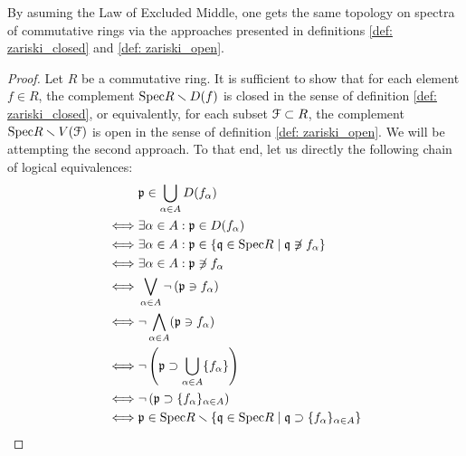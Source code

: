             \begin{proposition} \label{prop: zariski_topology_equivalence}
                By asuming the Law of Excluded Middle, one gets the same topology on spectra of commutative rings via the approaches presented in definitions \ref{def: zariski_closed} and \ref{def: zariski_open}.
            \end{proposition}
                \begin{proof}
                    Let $R$ be a commutative ring. It is sufficient to show that for each element $f \in R$, the complement $\Spec R \setminus D(f)$ is closed in the sense of definition \ref{def: zariski_closed}, or equivalently, for each subset $\calF \subset R$, the complement $\Spec R \setminus V(\calF)$ is open in the sense of definition \ref{def: zariski_open}. We will be attempting the second approach. To that end, let us directly the following chain of logical equivalences:
                        $$
                            \begin{aligned}
                                & \p \in \bigcup_{\alpha \in A} D(f_{\alpha})
                                \\
                                \iff & \exists \alpha \in A: \p \in D(f_{\alpha})
                                \\
                                \iff & \exists \alpha \in A: \p \in \{\q \in \Spec R \mid \q \not \ni f_{\alpha}\}
                                \\
                                \iff & \exists \alpha \in A: \p \not \ni f_{\alpha}
                                \\
                                \iff & \bigvee_{\alpha \in A} \neg\left(\p \ni f_{\alpha}\right)
                                \\
                                \iff & \neg \bigwedge_{\alpha \in A} (\p \ni f_{\alpha}) 
                                \\
                                \iff & \neg \left(\p \supset \bigcup_{\alpha \in A} \{f_{\alpha}\}\right)
                                \\
                                \iff & \neg \left(\p \supset \{f_{\alpha}\}_{\alpha \in A}\right)
                                \\
                                \iff & \p \in \Spec R \setminus \left\{\q \in \Spec R \mid \q \supset \{f_{\alpha}\}_{\alpha \in A}\right\}
                                \\

\end{aligned}$$
\end{proof}
